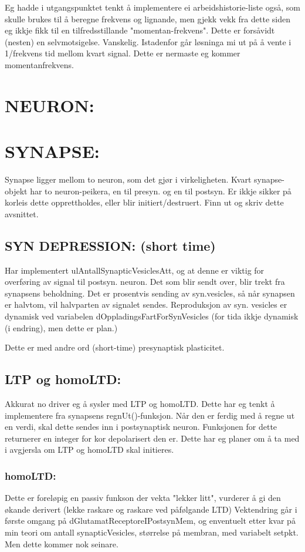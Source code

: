 \documentclass[norsk,11 pt]{report}
\begin{document}
Eg hadde i utgangspunktet tenkt å implementere ei arbeidshistorie-liste også, som skulle brukes til å beregne frekvens og lignande, men gjekk vekk fra dette
siden eg ikkje fikk til en tilfredsstillande "momentan-frekvens". Dette er forsåvidt (nesten) en selvmotsigelse. Vanskelig.
Istadenfor går løsninga mi ut på å vente i 1/frekvens tid mellom kvart signal. Dette er nermaste eg kommer momentanfrekvens.


\section{NEURON:}


\section{SYNAPSE:}
Synapse ligger mellom to neuron, som det gjør i virkeligheten. Kvart synapse-objekt har to neuron-peikera, en til presyn. og en til postsyn.
Er ikkje sikker på korleis dette opprettholdes, eller blir initiert/destruert. Finn ut og skriv dette avsnittet.
	\subsection{SYN DEPRESSION: (short time)}
	Har implementert ulAntallSynapticVesiclesAtt, og at denne er viktig for overføring av signal til postsyn. neuron. Det som blir sendt over, blir 
	trekt fra synapsens beholdning. Det er prosentvis sending av syn.vesicles, så når synapsen er halvtom, vil halvparten av signalet sendes.
	Reproduksjon av syn. vesicles er dynamisk ved variabelen dOppladingsFartForSynVesicles (for tida ikkje dynamisk (i endring), men dette er plan.)
	
	Dette er med andre ord (short-time) presynaptisk plasticitet.


	\subsection{LTP og homoLTD:}
	Akkurat no driver eg å sysler med LTP og homoLTD. Dette har eg tenkt å implementere fra synapsens regnUt()-funksjon. Når den er ferdig med å regne ut
	en verdi, skal dette sendes inn i postsynaptisk neuron. Funksjonen for dette returnerer en integer for kor depolarisert den er. Dette har eg planer 
	om å ta med i avgjersla om LTP og homoLTD skal initieres. 
		\subsubsection{homoLTD:}
		Dette er foreløpig en passiv funkson der vekta "lekker litt", vurderer å gi den økande derivert (lekke raskare og raskare ved påfølgande LTD)
		Vektendring går i første omgang på dGlutamatReceptoreIPostsynMem, og enventuelt etter kvar på min teori om 
		antall synapticVesicles, størrelse på membran, med variabelt setpkt. Men dette kommer nok seinare.
\end{document}
